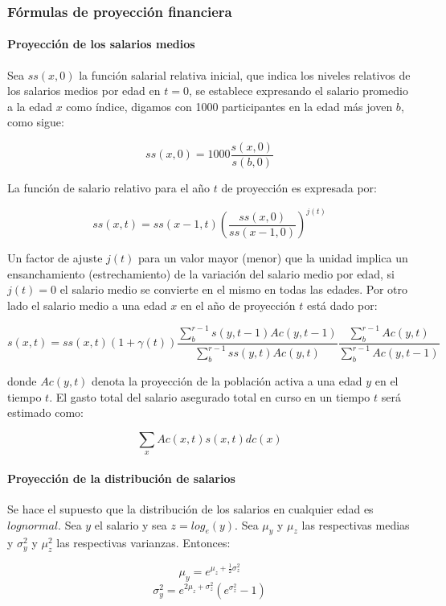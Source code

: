\documentclass[12pt,letterpaper,titlepage]{article}
\begin{document}
{\subsubsection{Fórmulas de proyección financiera}

\paragraph{Proyección de los salarios medios}

Sea $ss(x,0)$ la función salarial relativa inicial, que indica los niveles relativos de los salarios medios por edad en $t=0$, se establece expresando el salario promedio a la edad $x$ como índice, digamos con 1000 participantes en la edad más joven $b$, como sigue:

\[ ss(x,0)=1000\frac{s(x,0)}{s(b,0)} \]

La función de salario relativo para el año $t$ de proyección es expresada por:

\[ ss(x,t)=ss(x-1,t)\left( \dfrac{ss(x,0)}{ss(x-1,0)}\right) ^{j(t)} \]

Un factor de ajuste $j(t)$ para un valor mayor (menor) que la unidad implica un ensanchamiento (estrechamiento) de la variación del salario medio por edad, si $j(t)=0$ el salario medio se convierte en el mismo en todas las edades. Por otro lado el salario medio a una edad $x$ en el año de proyección $t$ está dado por:

\[ s(x,t)=ss(x,t)(1+\gamma(t))\dfrac{\sum\limits_{b}^{r-1}s(y,t-1)Ac(y,t-1)}{\sum\limits_{b}^{r-1}ss(y,t)Ac(y,t)}\dfrac{\sum\limits_{b}^{r-1}Ac(y,t)}{\sum\limits_{b}^{r-1}Ac(y,t-1)} \]

donde $Ac(y,t)$ denota la proyección de la población activa a una edad $y$ en el tiempo $t$. El gasto total del salario asegurado total en curso en un tiempo $t$ será estimado como:

\[ \sum\limits_{x}Ac(x,t)s(x,t)dc(x) \] 

\paragraph{Proyección de la distribución de salarios}

Se hace el supuesto que la distribución de los salarios en cualquier edad es $lognormal$. Sea $y$ el salario y sea $z=log_{e}(y)$. Sea $\mu_{y}$ y $\mu_{z}$ las respectivas medias y $\sigma^{2}_{y}$ y $\mu^{2}_{z}$ las respectivas varianzas. Entonces:

\[ \mu_{y}=e^{\mu_{z}+\frac{1}{2}\sigma^{2}_{z}} \]
\[ \sigma_{y}^{2}=e^{2\mu_{z}+\sigma^{2}_{z}}( e^{\sigma^{2}_{z}}-1) \]

}
\end{document}
